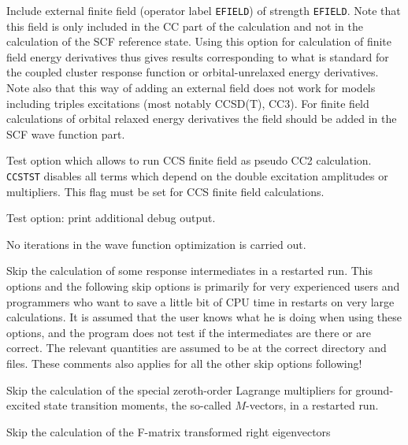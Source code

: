 \begin{description}
    Include external finite field (operator label \verb+EFIELD+)
    of strength \verb+EFIELD+. Note that this field is only included
    in the CC part of the calculation and not in the calculation of the
    SCF reference state. Using this option for calculation of finite field energy
    derivatives thus gives results corresponding to what is standard for the coupled cluster
    response function or orbital-unrelaxed energy derivatives.
    Note also that this way of adding an external field does not work for models including
    triples excitations (most notably CCSD(T), CC3).
    For finite field calculations of orbital relaxed energy derivatives the field
    should be added in the SCF wave function part.
 
\item[\Key{CCSTST}] 
   Test option which allows to run CCS finite field as pseudo CC2
   calculation. \verb+CCSTST+ disables all terms which depend on the
   double excitation amplitudes or multipliers. This flag must be
   set for CCS finite field calculations.
%
\item[\Key{DEBUG }]  
   Test option: print additional debug output.
%
\item[\Key{NOCCIT}]
   No iterations in the wave function optimization is carried out.
%
%
\item[\Key{IMSKIP}] 
   Skip the calculation of some response intermediates in a restarted run.
   This options and the following skip options is primarily for very experienced users 
   and programmers who want to save a little bit of CPU time in restarts on very large 
   calculations. 
   It is assumed that the user knows what he is doing when using these options, and
   the program does not test if the intermediates are there or are correct. 
   The relevant quantities are assumed to be at the correct directory and files.
   These comments also applies for all the other skip options following! 
%
\item[\Key{M1SKIP}] 
   Skip the calculation of the special zeroth-order Lagrange 
   multipliers for ground-excited state transition moments,
   the so-called $M$-vectors, in a restarted run.
%
\item[\Key{FRSKIP}] 
   Skip the calculation of the F-matrix transformed right eigenvectors

\end{description}
